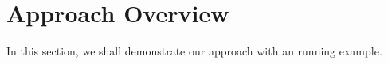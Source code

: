 \section{Approach Overview}

In this section, we shall demonstrate our approach with an running example.